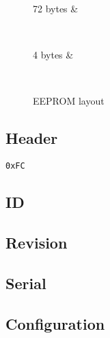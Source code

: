 \documentclass{article}
\begin{document}
\begin{figure}[H]
\begin{bytefield}[bitheight=4\baselineskip]{32}
		 	\begin{rightwordgroup}{72 bytes}
		 		 &
		 	\end{rightwordgroup} \\
		 	
		 	\begin{rightwordgroup}{4 bytes}
		 		 &
		 	\end{rightwordgroup} \\
		 	
		 	
	 	\end{bytefield}
	 	\caption{EEPROM layout}
	 	\label{fig:EEPROM_LAYOUT}
 \end{figure}
 
 \subsection{Header}
 \texttt{0xFC}
 
 \subsection{ID}
 
 \subsection{Revision}
 
 \subsection{Serial}
 
 \subsection{Configuration}
 
\end{document}
